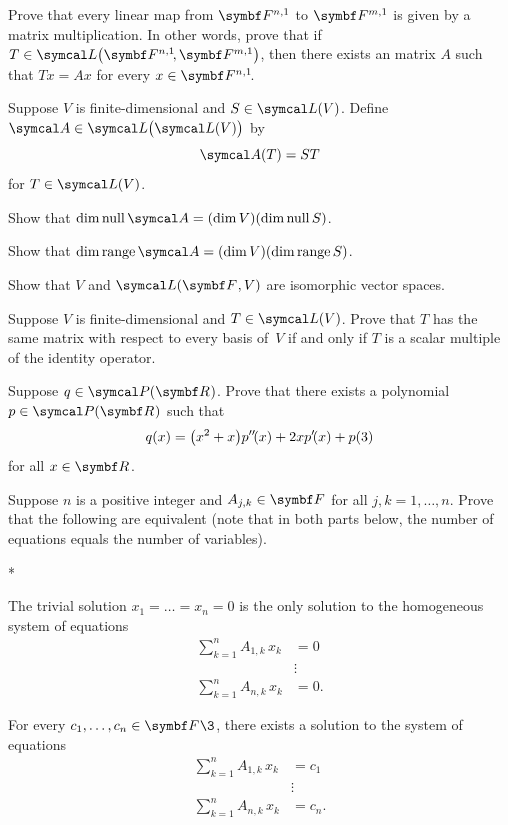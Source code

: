 \begin{exercises}
\exercise
Prove that every linear map from $\F{n,1}$ to $\F{m,1}$ is given by a matrix multiplication.  In other words, prove that if
$T \in \L\paren[\big]{\FF{n,1}, \F{m,1}}$, then there exists an  matrix $A$ such that $Tx = Ax$ for every $x \in \FF{n,1}$.


\exercise
Suppose $V$ is finite-dimensional and $S \in \L(V)$. Define $\A \in \L\paren[\big]{\L(V)}$ by
\[
\A(T) = ST
\vspace{-6bp}
\]
for $T \in \L(V)$.
\begin{subtheorem}
\item
Show that $\dim \ker \A  = (\dim V)(\dim \ker S)$.
\item
Show that $\dim \ran \A  = (\dim V)(\dim \ran S)$.
\end{subtheorem}
\exercisesubtheoremend


\exercise
Show that $V$ and $\L(\F{}, V)$ are isomorphic vector spaces.


\exercise
Suppose $V$ is finite-dimensional and $T \in \L(V)$. Prove that $T$ has the same matrix with respect to every basis of~$V$ if and only if $T$ is a scalar multiple of the identity operator.


\exercise
Suppose $q \in \P(\R{})$. Prove that there exists a polynomial $p \in \P(\R{})$ such that
\[
q(x) = \paren[\big]{x^2 + x} p'' \! (x) +2x p' \! (x) + p(3)
\]
for all $x \in \R{}$.


\exercise
Suppose $n$ is a positive integer and $A_{j,k} \in \F{}$ for all $j,k = 1, \dots, n$.
Prove that the following are equivalent (note that in both parts below, the number of equations equals the number of  variables).
\begin{subtheorem}*
\item
The trivial solution $x_1 = \dots = x_n = 0$ is the only solution to the
homogeneous system of equations
\begin{align*}
\sum_{k=1}^n A_{1,k} \, x_k &= 0 \\
& \vdots \\
\sum_{k=1}^n A_{n,k} \, x_k &= 0.
\end{align*}

\item
For every $c_1, \dots, c_n \in \F{}\3$, there exists a solution to the system of
equations
\begin{align*}
\sum_{k=1}^n A_{1,k} \, x_k &= c_1 \\
& \vdots \\
\sum_{k=1}^n A_{n,k} \, x_k &= c_n.
\end{align*}
\end{subtheorem}



\end{exercises}

